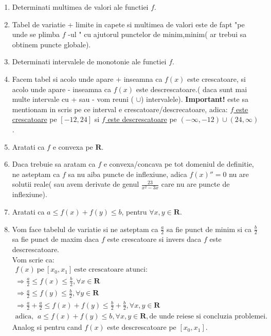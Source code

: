\documentclass[11pt]{article}
\begin{document}
\begin{enumerate}[1)]
    \item   Determinati multimea de valori ale functiei $f$.
        \item[] Tabel de variatie + limite in capete si multimea de valori este de fapt "pe unde se plimba
                $f$ -ul " cu ajutorul punctelor de minim,minim( ar trebui sa obtinem puncte globale).
                
    \item   Determinati intervalele de monotonie ale functiei $f$.
        \item[] Facem tabel si acolo unde apare + inseamna ca $f(x)$ este crescatoare, si acolo unde apare
                - inseamna ca $f(x)$ este descrescatoare.( daca sunt mai multe intervale cu + sau - vom
                reuni ( $\cup$) intervalele). \textbf{Important!} este sa mentionam in scris pe ce 
                interval e crescatoare/descrecatoare, adica: \underline{$f$ este crescatoare} pe $[-12, 24]$
                si \underline{$f$ este descrescatoare} pe $(-\infty,-12) \cup (24, \infty)$.
                
    \item   Aratati ca $f$ e convexa pe $\mathbf{R}$. 
        \item[] Daca trebuie sa aratam ca $f$ e convexa/concava pe tot domeniul de definitie, ne asteptam
                ca $f$ sa nu aiba puncte de inflexiune, adica $f(x)'' = 0$ nu are solutii reale( sau avem
                derivate de genul $\frac{23}{x^2 - 3x}$ care nu are puncte de inflexiune).
   \item    Aratati ca $a \leq f(x) + f(y) \leq b$, pentru $\forall x,y \in \mathbf{R} $.
        \item[] Vom face tabelul de variatie si ne asteptam ca $\frac{a}{2}$ sa fie punct de minim si ca
                $\frac{b}{2}$ sa fie punct de maxim daca $f$ este crescatoare si invers daca $f$ este
                descrescatoare.\\
                Vom scrie ca: 
                \begin{gather*}
                    f(x) \: \text{pe} \: [x_0,x_1] \: \text{este crescatoare atunci:}  \\
                    \Rightarrow \frac{a}{2} \leq f(x) \leq \frac{b}{2}, \forall x \in \mathbf{R} \\
                    \Rightarrow \frac{a}{2} \leq f(y) \leq \frac{b}{2}, \forall y \in \mathbf{R} \\
                    \Longrightarrow  \frac{a}{2} +  \frac{a}{2} \leq f(x) + f(y) \leq \frac{b}{2} + \frac{b}
                    {2},
                    \forall x,y \in \mathbf{R} \\
                    \text{adica, } \: a \leq f(x) + f(y) \leq b, \forall x,y \in \mathbf{R}, \text{de unde
                    reiese si concluzia problemei.}
                \end{gather*}
                Analog si pentru cand $f(x)$ este descrescatoare pe $[x_0, x_1]$.
                
\end{enumerate}
\end{document}
